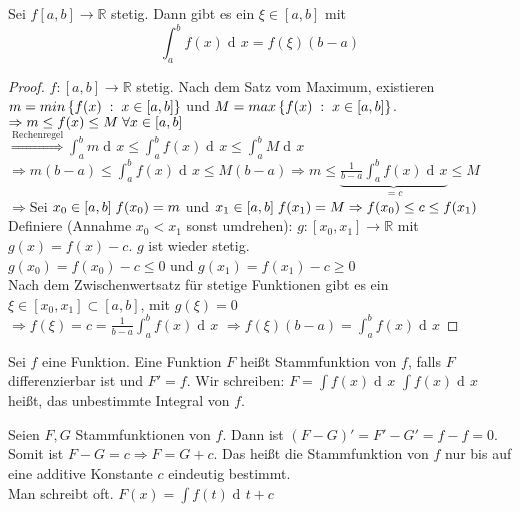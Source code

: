 \documentclass[a4paper,titlepage,oneside]{article}
\def\R{\ensuremath{\mathbb{R}} }
\newcommand{\der}{\operatorname{d\!}{}}
\newcommand{\dx}{\der x}
\def\sp{\hspace{0,1cm}}
\newcommand{\menge}[2]{\ensuremath{\left\{#1\sp : \sp #2\right\}}}
\newcommand{\integral}[4][x]{\ensuremath{\int_{#2}^{#3}{#4\der #1}}}
\newcommand{\intAB}[2][x]{\integral[#1]{a}{b}{#2}}
\theoremstyle{thmstyle}
\begin{document}
\begin{satz}
Sei $f [a,b] \to \R$ stetig. Dann gibt es ein $\xi \in [a,b]$ mit \[\intAB{f(x)} = f(\xi)(b-a)\]
\begin{proof}
$f: [a,b] \to \R$ stetig. Nach dem Satz vom Maximum, existieren $m = min\menge{f(x)}{x \in [a,b]}$ und $M = max\menge{f(x)}{x \in [a,b]}$.\\
$\Rightarrow m \le f(x) \le M \sp \forall x \in [a,b]$\\
$\displaystyle  \overset{\text{Rechenregel}}{\Rightarrow } \intAB{m} \le \intAB{f(x)} \le \intAB{M}$\\
$\displaystyle  \Rightarrow m(b-a) \le \intAB{f(x)} \le M(b-a) \Rightarrow m \le \underbrace{\frac{1}{b-a}\intAB{f(x)}}_{= c} \le M$\\
$\Rightarrow $Sei $ x_0 \in [a,b] \sp f(x_0) = m$ und $x_1 \in [a,b] \sp f(x_1) = M \Rightarrow f(x_0) \le c \le f(x_1)$\\
Definiere (Annahme $x_0 < x_1$ sonst umdrehen): $g: [x_0,x_1] \to \R$ mit $g(x) = f(x) - c$. $g$ ist wieder stetig.\\
$g(x_0) = f(x_0) -c  \le 0$ und $g(x_1) = f(x_1) - c \ge 0$\\
Nach dem Zwischenwertsatz für stetige Funktionen gibt es ein $\xi \in  [x_0,x_1] \subset [a,b]$, mit $g(\xi) = 0$\\
$\displaystyle \Rightarrow f(\xi) = c = \frac{1}{b-a}\intAB{f(x)}$
$\displaystyle \Rightarrow f(\xi)(b-a) = \intAB{f(x)}$
\end{proof}
\end{satz}

\begin{defi}
Sei $f$ eine Funktion. Eine Funktion $F$ heißt Stammfunktion von $f$, falls $F$ differenzierbar ist und $F' = f$.
Wir schreiben: $\displaystyle F = \int{f(x)\dx}$
$\int{f(x)\dx}$ heißt, das unbestimmte Integral von $f$.
\end{defi}

\begin{bem}
Seien $F,G$ Stammfunktionen von $f$. Dann ist $(F-G)' = F' - G' = f - f = 0$. Somit ist $F-G = c \Rightarrow F = G + c$. Das heißt die Stammfunktion von $f$ nur bis auf eine additive Konstante $c$ eindeutig bestimmt.\\
Man schreibt oft. $F(x) = \int{f(t)\der t} + c$
\end{bem}
\end{document}
